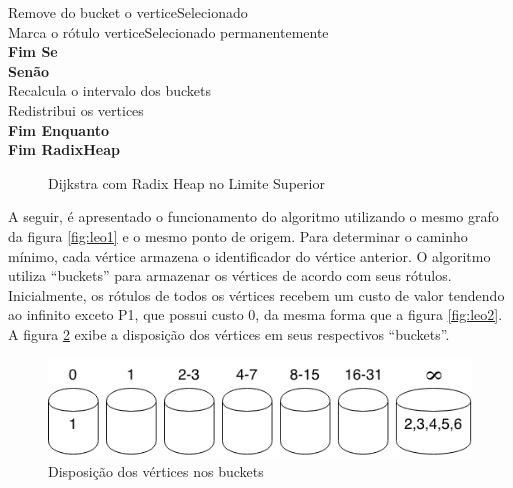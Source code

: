 {\begin{minipage}{70ex}
\vspace*{-1mm} \phantom{} \hspace{9ex} Remove do bucket o verticeSelecionado\\
\vspace*{-1mm} \phantom{} \hspace{9ex} Marca o rótulo verticeSelecionado permanentemente\\
\vspace*{-1mm} \phantom{} \hspace{6ex} {\bf Fim Se}\\
\vspace*{-1mm} \phantom{} \hspace{6ex} {\bf Senão}\\
\vspace*{-1mm} \phantom{} \hspace{9ex} Recalcula o intervalo dos buckets\\
\vspace*{-1mm} \phantom{} \hspace{9ex} Redistribui os vertices\\
\vspace*{-1mm} \phantom{} \hspace{3ex} {\bf Fim Enquanto}\\
\vspace*{-1mm} \phantom{} \hspace{0ex} {\bf Fim RadixHeap}\\
\end{minipage}}
\begin{figure}[htbp]
\centering
\caption{Dijkstra com Radix Heap no Limite Superior}
\label{fig:radixMod}
\end{figure}

A seguir, é apresentado o funcionamento do algoritmo utilizando o mesmo grafo da figura \ref{fig:leo1}
e o mesmo ponto de origem. Para determinar o caminho mínimo, cada vértice armazena o identificador do vértice anterior.
O algoritmo utiliza ``buckets'' para armazenar os vértices de acordo com seus rótulos.
Inicialmente, os rótulos de todos os vértices recebem um custo de valor tendendo ao infinito exceto P1,
que possui custo 0, da mesma forma que a figura \ref{fig:leo2}. A figura \ref{fig:buckets} exibe a disposição dos vértices em seus
respectivos ``buckets''.

\begin{figure}[htbp]
\centering
 \includegraphics[width=.50\textwidth]{chapters/fig/buckets.png}
\caption{Disposição dos vértices nos buckets}
\label{fig:buckets}
\end{figure}
\FloatBarrier

